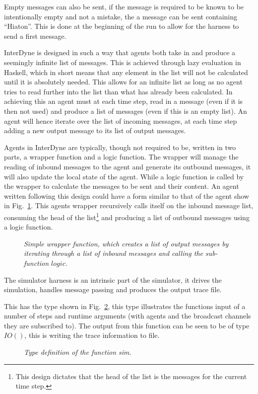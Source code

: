 \documentclass{article}
\begin{document}
Empty messages can also be sent, if the message is required to be known to be intentionally empty and not a mistake, the a message can be sent containing ``Hiaton''. This is done at the beginning of the run to allow for the harness to send a first message. 

InterDyne is designed in such a way that agents both take in and produce a seemingly infinite list of messages. This is achieved through lazy evaluation in Haskell, which in short means that any element in the list will not be calculated until it is absolutely needed. This allows for an infinite list as long as no agent tries to read further into the list than what has already been calculated. In achieving this an agent must at each time step, read in a message (even if it is then not used) and produce a list of messages (even if this is an empty list). An agent will hence iterate over the list of incoming messages, at each time step adding a new output message to its list of output messages.  

Agents in InterDyne are typically, though not required to be, written in two parts, a wrapper function and a logic function. The wrapper will manage the reading of inbound messages to the agent and generate its outbound messages, it will also update the local state of the agent. While a logic function is called by the wrapper to calculate the messages to be sent and their content. An agent written following this design could have a form similar to that of the agent show in Fig.~\ref{fig:wrapperfrominterdyne}. This agent\textsc{}s wrapper recursively calls itself on the inbound message list, consuming the head of the list\footnote{This design dictates that the head of the list is the messages for the current time step.} and producing a list of outbound messages using a logic function.  
\begin{figure}[H]
	\centering
        
	\caption{\it Simple wrapper function, which creates a list of output messages by iterating through a list of inbound messages and calling the sub-function $logic$.}
	\label{fig:wrapperfrominterdyne}
\end{figure} 

The simulator harness is an intrinsic part of the simulator, it drives the simulation, handles message passing and produces the output trace file.

This has the type shown in Fig.~\ref{fig:harntypintfirst}, this type illustrates the functions input of a number of steps and runtime arguments (with agents and the broadcast channels they are subscribed to). The output from this function can be seen to be of type $IO()$, this is writing the trace information to file.  
\begin{figure}[H]
	\centering
        
	\caption{\it Type definition of the function sim.}
	\label{fig:harntypintfirst}
\end{figure} 
\end{document}
